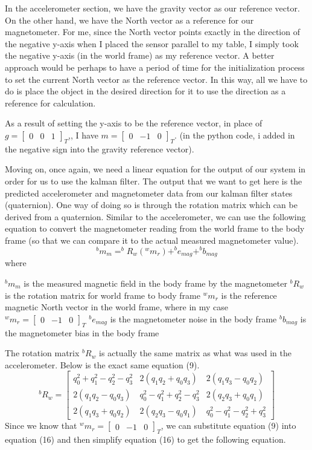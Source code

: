 \documentclass[a4paper,12pt]{book}
\begin{document}
In the accelerometer section, we have the gravity vector as our reference vector. On the other hand, we have the North vector as a reference for our magnetometer. For me, since the North vector points exactly in the direction of the negative y-axis when I placed the sensor parallel to my table, I simply took the negative y-axis (in the world frame) as my reference vector. A better approach would be perhaps to have a period of time for the initialization process to set the current North vector as the reference vector. In this way, all we have to do is place the object in the desired direction for it to use the direction as a reference for calculation.

As a result of setting the y-axis to be the reference vector, in place of $g=\begin{bmatrix} 0 &0 &1\end{bmatrix}_T$,, I have $m=\begin{bmatrix} 0 &-1 &0\end{bmatrix}_T$. (in the python code, i added in the negative sign into the gravity reference vector).

Moving on, once again, we need a linear equation for the output of our system in order for us to use the kalman filter. The output that we want to get here is the predicted accelerometer and magnetometer data from our kalman filter states (quaternion). One way of doing so is through the rotation matrix which can be derived from a quaternion. Similar to the accelerometer, we can use the following equation to convert the magnetometer reading from the world frame to the body frame (so that we can compare it to the actual measured magnetometer value).
\begin{equation}
    ^bm_m = ^bR_w(^wm_r) + ^be_{mag} + ^bb_{mag}
\end{equation}
where

$^bm_m$ is the measured magnetic field in the body frame by the magnetometer
$^bR_w$ is the rotation matrix for world frame to body frame
$^wm_r$ is the reference magnetic North vector in the world frame, where in my case $^wm_r=\begin{bmatrix} 0 &-1 &0\end{bmatrix}_T$
$^be_{mag}$ is the magnetometer noise in the body frame
$^bb_{mag}$ is the magnetometer bias in the body frame

The rotation matrix $^bR_w$ is actually the same matrix as what was used in the accelerometer. Below is the exact same equation (9).
\begin{equation}
    ^bR_w = \begin{bmatrix} q_0^2+q_1^2-q_2^2-q_3^2 & 2(q_1q_2+q_0q_3) & 2(q_1q_3-q_0q_2) \\ 2(q_1q_2-q_0q_3) & q_0^2-q_1^2+q_2^2-q_3^2 & 2(q_2q_3+q_0q_1) \\ 2(q_1q_3+q_0q_2) & 2(q_2q_3-q_0q_1) & q_0^2-q_1^2-q_2^2+q_3^2 \end{bmatrix}
\end{equation}
Since we know that $^wm_r=\begin{bmatrix} 0 &-1 &0\end{bmatrix}_T$, we can substitute equation (9) into equation (16) and then simplify equation (16) to get the following equation.
\end{document}
